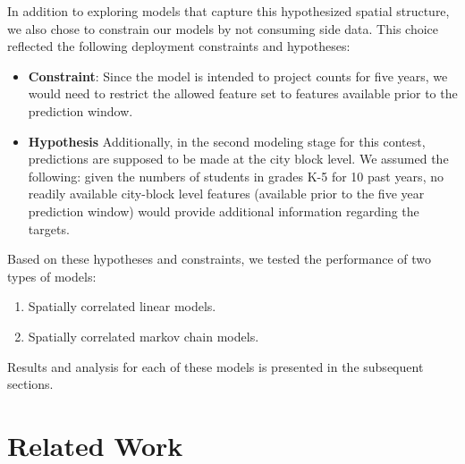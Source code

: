 \documentclass[journal]{IEEEtran}
\begin{document}
In addition to exploring models that capture this hypothesized spatial structure, we also chose to constrain our models by not consuming side data. This choice reflected the following deployment constraints and hypotheses:
\begin{itemize}
\item \textbf{Constraint}: Since the model is intended to project counts for five years, we would need to restrict the allowed feature set to features available prior to the prediction window.
\item \textbf{Hypothesis} Additionally, in the second modeling stage for this contest, predictions are supposed to be made at the city block level. We assumed the following: given the numbers of students in grades K-5 for 10 past years, no readily available city-block level features (available prior to the five year prediction window) would provide additional information regarding the targets.
\end{itemize}
Based on these hypotheses and constraints, we tested the performance of two types of models:
\begin{enumerate}
    \item Spatially correlated linear models.
    \item Spatially correlated markov chain models.
\end{enumerate}
Results and analysis for each of these models is presented in the subsequent sections.

\section{Related Work}
\end{document}
